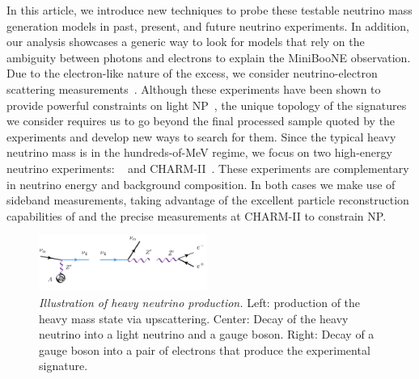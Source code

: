 In this article, we introduce new techniques to probe these testable neutrino mass generation models in past, present, and future neutrino experiments. In addition, our analysis showcases a generic way to look for models that rely on the ambiguity between photons and electrons to explain the MiniBooNE observation. Due to the electron-like nature of the excess, we consider neutrino-electron scattering measurements~\cite{Auerbach:2001wg, Deniz:2009mu,Bellini:2011rx,Park:2013dax,Vilain:1994qy}. Although these experiments have been shown to provide powerful constraints on light NP~\cite{Pospelov:2017kep,Lindner:2018kjo,Magill:2018tbb}, the unique topology of the signatures we consider requires us to go beyond the final processed sample quoted by the experiments and develop new ways to search for them.
Since the typical heavy neutrino mass is in the hundreds-of-MeV regime, we focus on two high-energy neutrino experiments: \minerva~\cite{Park:2013dax,Park:2015eqa,Valencia-Rodriguez:2016vkf} and CHARM-II~\cite{DeWinter:1989zg,Geiregat:1992zv,Vilain:1994qy}. These experiments are complementary in neutrino energy and background composition. In both cases we make use of sideband measurements, taking advantage of the excellent particle reconstruction capabilities of \minerva and the precise measurements at CHARM-II to constrain NP.
%
\begin{figure}[t!]
    \centering
    \includegraphics[width=0.49\textwidth]{diagram.pdf}
    \caption{{\textit{Illustration of heavy neutrino production.}} Left: production of the heavy mass state via upscattering. Center: Decay of the heavy neutrino into a light neutrino and a gauge boson. Right: Decay of a gauge boson into a pair of electrons that produce the experimental signature.\label{fig:diagram}}
\end{figure}

